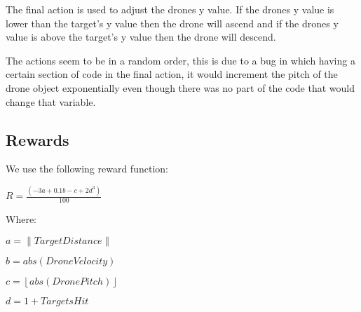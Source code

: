 The final action is used to adjust the drones y value. If the drones y value is lower than the target's y value then the drone will ascend and if the drones y value is above the target's y value then the drone will descend. 

The actions seem to be in a random order, this is due to a bug in which having a certain section of code in the final action, it would increment the pitch of the drone object exponentially even though there was no part of the code that would change that variable.

\subsection{Rewards}
We use the following reward function:

$R=\frac{(-3a+0.1b-c+2d^3)}{100}$

Where:

$a=\left \| Target Distance \right \|$

$b=abs(Drone Velocity)$

$c= \left \lfloor abs(DronePitch)  \right \rfloor $

$d=1+TargetsHit$

